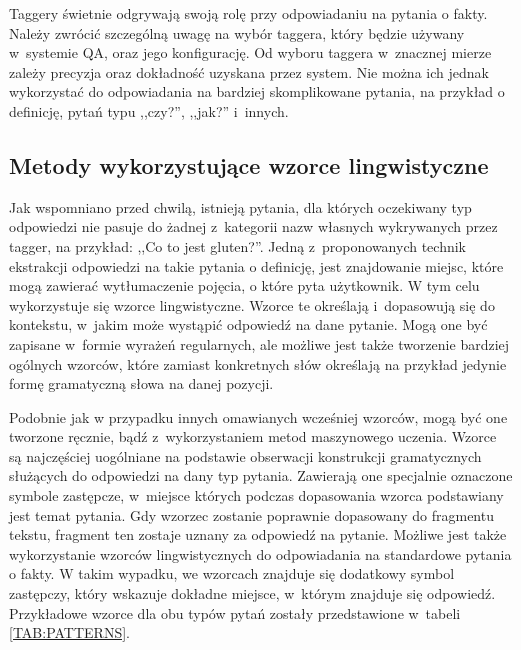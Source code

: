 \documentclass[a4paper, twoside, 12pt]{report}
\begin{document}
            Taggery świetnie odgrywają swoją rolę przy odpowiadaniu na pytania o fakty. Należy zwrócić szczególną uwagę
            na wybór taggera, który będzie używany w~systemie QA, oraz jego konfigurację. Od wyboru taggera w~znacznej
            mierze zależy precyzja oraz dokładność uzyskana przez system\cite{NERQA}. Nie można ich jednak
            wykorzystać do odpowiadania na bardziej skomplikowane pytania, na przykład o definicję, pytań typu ,,czy?'',
            ,,jak?'' i~innych.

        \subsection{Metody wykorzystujące wzorce lingwistyczne}
            Jak wspomniano przed chwilą, istnieją pytania, dla których oczekiwany typ odpowiedzi nie pasuje do żadnej
            z~kategorii nazw własnych wykrywanych przez tagger, na przykład: ,,Co to jest gluten?''. Jedną z~proponowanych
            technik ekstrakcji odpowiedzi na takie pytania o definicję, jest znajdowanie miejsc, które mogą zawierać
            wytłumaczenie pojęcia, o które pyta użytkownik. W tym celu wykorzystuje się wzorce lingwistyczne. Wzorce te
            określają i~dopasowują się do kontekstu, w~jakim może wystąpić odpowiedź na dane pytanie. Mogą one być zapisane
            w~formie wyrażeń regularnych, ale możliwe jest także tworzenie bardziej ogólnych wzorców, które zamiast
            konkretnych słów określają na przykład jedynie formę gramatyczną słowa na danej pozycji.

            Podobnie jak w
            przypadku innych omawianych wcześniej wzorców, mogą być one tworzone ręcznie, bądź z~wykorzystaniem
            metod maszynowego uczenia. Wzorce są najczęściej uogólniane na podstawie obserwacji konstrukcji gramatycznych
            służących do odpowiedzi na dany typ pytania. Zawierają one specjalnie oznaczone symbole zastępcze, w~miejsce
            których podczas dopasowania wzorca podstawiany jest temat pytania. Gdy wzorzec zostanie poprawnie dopasowany
            do fragmentu tekstu, fragment ten zostaje uznany za odpowiedź na pytanie. Możliwe jest także wykorzystanie
            wzorców lingwistycznych do odpowiadania na standardowe pytania o fakty. W takim wypadku, we wzorcach znajduje
            się dodatkowy symbol zastępczy, który wskazuje dokładne miejsce, w~którym znajduje się odpowiedź. Przykładowe
            wzorce dla obu typów pytań zostały przedstawione w~tabeli \ref{TAB:PATTERNS}.
\end{document}
